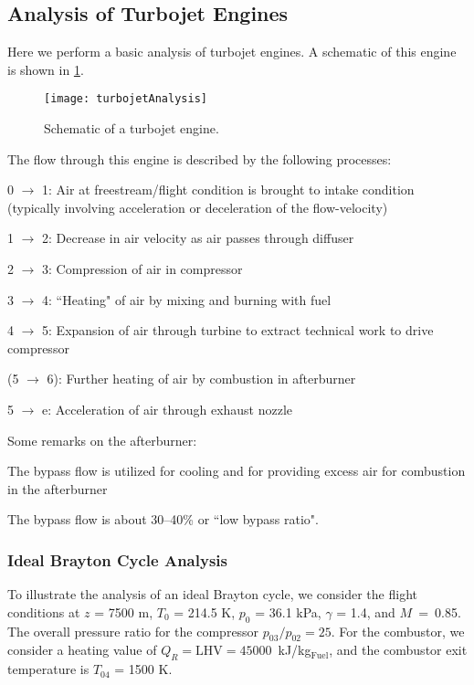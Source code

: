 \subsection{Analysis of Turbojet Engines}
Here we perform a basic analysis of turbojet engines. A schematic of this engine is shown in \cref{FIG_TURBOJET_ANALYSIS}.
\begin{figure}[!htb!]
 \centering
    {\texttt{[image: turbojetAnalysis]}}
    \caption{\label{FIG_TURBOJET_ANALYSIS}Schematic of a turbojet engine.}
\end{figure}
The flow through this engine is described by the following processes:
\begin{itemizePacked}
\item 0 $\rightarrow$ 1: Air at freestream/flight condition is brought to intake condition (typically involving acceleration or deceleration of the flow-velocity)
\item 1 $\rightarrow$ 2: Decrease in air velocity as air passes through diffuser
\item 2 $\rightarrow$ 3: Compression of air in compressor
\item 3 $\rightarrow$ 4: ``Heating" of air by mixing and burning with fuel
\item 4 $\rightarrow$ 5: Expansion of air through turbine to extract technical work to drive compressor
\item (5 $\rightarrow$ 6): Further heating of air by combustion in afterburner
\item 5 $\rightarrow$ e: Acceleration of air through exhaust nozzle
\end{itemizePacked}
Some remarks on the afterburner:
\begin{itemizePacked}
\item The bypass flow is utilized for cooling and for providing excess air for combustion in the afterburner
\item The bypass flow is about 30--40\% or ``low bypass ratio".
\end{itemizePacked}

\subsubsection{Ideal Brayton Cycle Analysis}
To illustrate the analysis of an ideal Brayton cycle, we consider the flight conditions at $z$ = 7500 m, $T_0$ = 214.5 K, $p_0$ = 36.1 kPa, $\gamma$ = 1.4, and $M$~=~0.85. The overall pressure ratio for the compressor $p_{03}/p_{02} = 25$. For the combustor, we consider a heating value of  $Q_R = \text{LHV} = 45000$~kJ/kg$_\text{Fuel}$, and the combustor exit temperature is $T_{04}$ = 1500 K.

